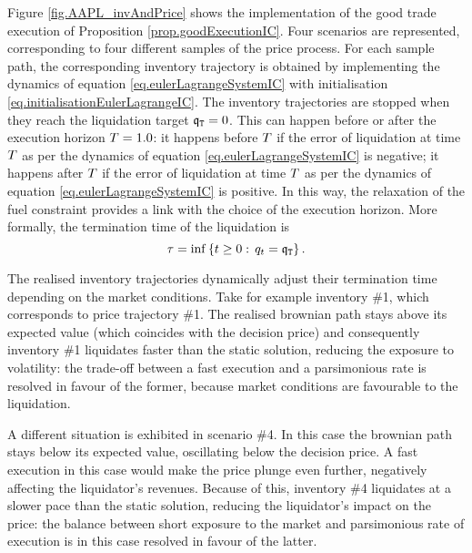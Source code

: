 \documentclass[10pt,a4paper]{article}
\begin{document}
	
	Figure \ref{fig.AAPL_invAndPrice} shows the implementation of the good trade execution of Proposition \ref{prop.goodExecutionIC}. Four scenarios are represented, corresponding to four different samples of the price process. For each sample path, the corresponding inventory trajectory is obtained by implementing the dynamics of equation \eqref{eq.eulerLagrangeSystemIC} with initialisation \eqref{eq.initialisationEulerLagrangeIC}. The inventory trajectories are stopped when they reach the liquidation target $\mathfrak{q}_{\mathtt{T} } = 0$. This can happen before  or after the execution horizon  $T = 1.0$: it happens before $T$ if the error of liquidation at time $T$ as per the dynamics of equation \eqref{eq.eulerLagrangeSystemIC} is negative; it happens after  $T$ if the error of liquidation at time $T$ as per the dynamics of equation \eqref{eq.eulerLagrangeSystemIC} is positive. In this way, the relaxation of the fuel  constraint provides a link with the choice of the execution horizon. More formally, the termination time of the liquidation is 
	\begin{equation*}
	\tau = \inf \left\lbrace t\geq 0 : \, q_t = \mathfrak{q}_{\mathtt{T} } \right\rbrace. 
	\end{equation*}
	
	The realised inventory trajectories dynamically adjust their termination time depending on the market conditions. Take for example inventory \#1, which corresponds to price trajectory \#1. The realised brownian path stays above its expected value (which coincides with the decision price) and consequently inventory \#1 liquidates faster than the static solution, reducing the exposure to volatility: the trade-off between a fast execution and a parsimonious rate is resolved in favour of the former, because market conditions are favourable to the liquidation. 
	
	A different situation is exhibited in scenario \#4. In this case the brownian path stays below its expected value, oscillating below the decision price. A fast execution in this case would make the price plunge even further, negatively affecting the liquidator's revenues. Because of this, inventory \#4 liquidates at a slower pace than the static solution, reducing the liquidator's impact on the price: the balance between short exposure to the market and parsimonious rate of execution is in this case resolved in favour of the latter. 
	
	
	
\end{document}

